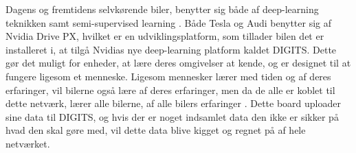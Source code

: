 Dagens og fremtidens selvkørende biler, benytter sig både af deep-learning teknikken samt semi-supervised learning \cite{Musk}. Både Tesla og Audi benytter sig af Nvidia Drive PX, hvilket er en udviklingsplatform, som tillader bilen det er installeret i, at tilgå Nvidias nye deep-learning platform kaldet DIGITS. Dette gør det muligt for enheder, at lære deres omgivelser at kende, og er designet til at fungere ligesom et menneske. Ligesom mennesker lærer med tiden og af deres erfaringer, vil bilerne også lære af deres erfaringer, men da de alle er koblet til dette netværk, lærer alle bilerne, af alle bilers erfaringer \cite{Nvidia}. Dette board uploader sine data til DIGITS, og hvis der er noget indsamlet data den ikke er sikker på hvad den skal gøre med, vil dette data blive kigget og regnet på af hele netværket.